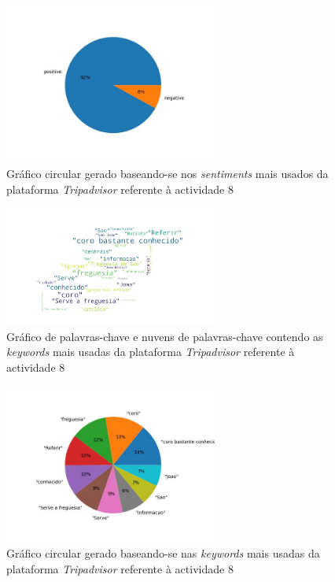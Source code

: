     \begin{figure}[!htb]
    \centering
    \includegraphics[width=7cm]{figuras/TripAdvisor/Activities/place8_sentiments.jpeg}
    \caption{Gráfico circular gerado baseando-se nos \textit{sentiments} mais usados da plataforma \textit{Tripadvisor} referente à actividade 8}
    \label{fig:exemplofig}
    \end{figure}
    
    \begin{figure}[!htb]
    \centering
    \includegraphics[width=7cm]{figuras/TripAdvisor/Activities/place8_keywordcloud.jpeg}
    \caption{Gráfico de palavras-chave e nuvens de palavras-chave contendo as \textit{keywords} mais usadas da plataforma \textit{Tripadvisor} referente à actividade 8}
    \label{fig:exemplofig}
    \end{figure}
    
    \begin{figure}[!htb]
    \centering
    \includegraphics[width=7cm]{figuras/TripAdvisor/Activities/place8_keywords.jpeg}
    \caption{Gráfico circular gerado baseando-se nas \textit{keywords} mais usadas da plataforma \textit{Tripadvisor} referente à actividade 8}
    \label{fig:exemplofig}
    \end{figure}
    
